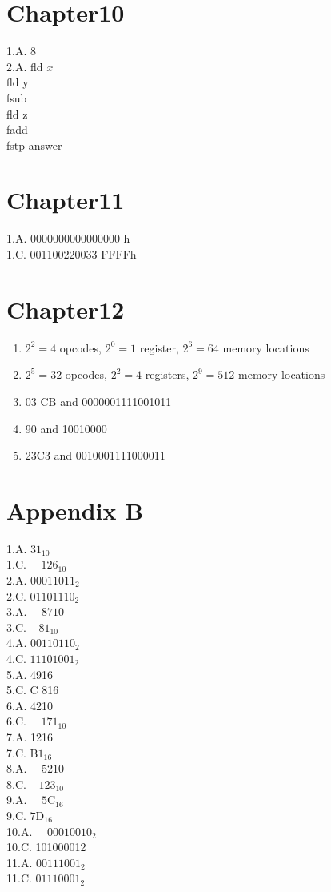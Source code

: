 \documentclass[10pt]{book}
\begin{document}
\section{Chapter10}
1.A. 8\\
2.A. fld $x$\\
fld y\\
fsub\\
fld z\\
fadd\\
fstp answer

\section{Chapter11}
1.A. 0000000000000000 h\\
1.C. 001100220033 FFFFh

\section{Chapter12}
\begin{enumerate}
  \item $2^{2}=4$ opcodes, $2^{0}=1$ register, $2^{6}=64$ memory locations
  \item $2^{5}=32$ opcodes, $2^{2}=4$ registers, $2^{9}=512$ memory locations
  \item 03 CB and 0000001111001011
  \item 90 and 10010000
  \item 23C3 and 0010001111000011
\end{enumerate}


\section{Appendix B}
1.A. $31_{10}$\\
1.C. $\quad 126_{10}$\\
2.A. $00011011_{2}$\\
2.C. $01101110_{2}$\\
3.A. $\quad 8710$\\
3.C. $-81_{10}$\\
4.A. $00110110_{2}$\\
4.C. $11101001_{2}$\\
5.A. 4916\\
5.C. C 816\\
6.A. 4210\\
6.C. $\quad 171_{10}$\\
7.A. 1216\\
7.C. $\mathrm{B} 1_{16}$\\
8.A. $\quad 5210$\\
8.C. $-123_{10}$\\
9.A. $\quad 5 \mathrm{C}_{16}$\\
9.C. $7 \mathrm{D}_{16}$\\
10.A. $\quad 00010010_{2}$\\
10.C. 101000012\\
11.A. $00111001_{2}$\\
11.C. $01110001_{2}$
\end{document}
